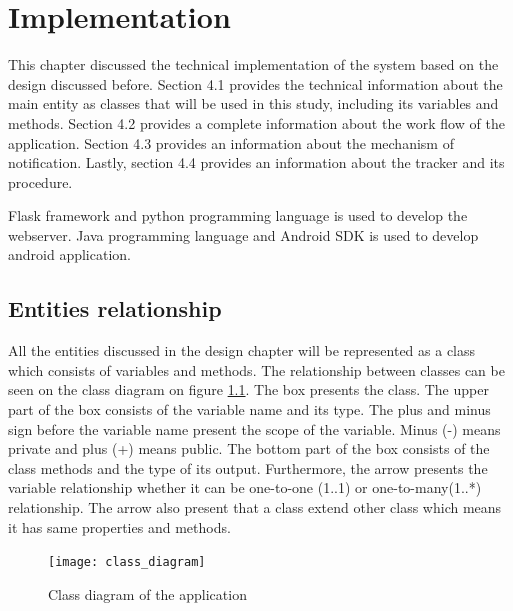 


\chapter{Implementation}
This chapter discussed the technical implementation of the system based on the design discussed before.
Section 4.1 provides the technical information about the main entity as classes that will be used in this study, including its variables and methods.
Section 4.2  provides a complete information about the work flow of the application.
Section 4.3 provides an information about the mechanism of notification. Lastly, section 4.4 provides an information about the tracker and its procedure.

Flask framework and python programming language is used to develop the webserver. Java programming language and Android SDK is used to develop android application.





\section{Entities relationship}
All the entities discussed in the design chapter will be represented as a class which consists of variables and methods.
The relationship between classes can be seen on the class diagram on figure \ref{fig:class_diagram}.
 The box presents the class. The upper part of the box consists of the variable name and its type.
 The plus and minus sign before the variable name present the scope of the variable.
  Minus (-) means private and plus (+) means public.
  The bottom part of the box consists of the class methods and the type of its output.
  Furthermore, the arrow presents the variable relationship whether it can be one-to-one (1..1)  or one-to-many(1..*) relationship.
  The arrow also present that a class extend other class which means it has same properties and methods.

\begin{figure}
\begin{center}
\texttt{[image: class\_diagram]}
\end{center}
\caption{Class diagram of the application}
\label{fig:class_diagram}
\end{figure}

